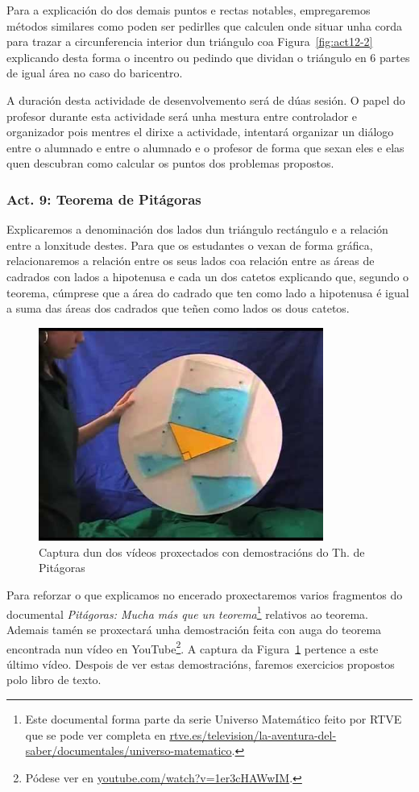Para a explicación do dos demais puntos e rectas notables, empregaremos métodos similares como poden ser pedirlles que calculen onde situar unha corda para trazar a circunferencia interior dun triángulo coa Figura~\ref{fig:act12-2} explicando desta forma o incentro ou pedindo que dividan o triángulo en 6 partes de igual área no caso do baricentro.

A duración desta actividade de desenvolvemento será de dúas sesión. O papel do profesor durante esta actividade será unha mestura entre controlador e organizador pois mentres el dirixe a actividade, intentará organizar un diálogo entre o alumnado e entre o alumnado e o profesor de forma que sexan eles e elas quen descubran como calcular os puntos dos problemas propostos.

\subsubsection{Act. 9: Teorema de Pitágoras}\label{act:pitagoras}
Explicaremos a denominación dos lados dun triángulo rectángulo e a relación entre a lonxitude destes. Para que os estudantes o vexan de forma gráfica, relacionaremos a relación entre os seus lados coa relación entre as áreas de cadrados con lados a hipotenusa e cada un dos catetos explicando que, segundo o teorema, cúmprese que a área do cadrado  que ten como lado a hipotenusa é igual a suma das áreas dos cadrados que teñen como lados os dous catetos.

\begin{figure}[h!]
  \centering
  \includegraphics[height=7cm]{img/pitagoras.jpg}
  \caption{Captura dun dos vídeos proxectados con demostracións do Th. de Pitágoras}\label{fig:act10}
\end{figure}

Para reforzar o que explicamos no encerado proxectaremos varios fragmentos do documental \emph{Pitágoras: Mucha más que un teorema}\footnote{Este documental forma parte da serie Universo Matemático feito por RTVE que se pode ver completa en \href{http://www.rtve.es/television/la-aventura-del-saber/documentales/universo-matematico/}{rtve.es/television/la-aventura-del-saber/documentales/universo-matematico}.} relativos ao teorema. Ademais tamén se proxectará unha demostración feita con auga do teorema encontrada nun vídeo en YouTube\footnote{Pódese ver en \href{https://www.youtube.com/watch?v=1er3cHAWwIM}{youtube.com/watch?v=1er3cHAWwIM}.}. A captura da Figura~\ref{fig:act10} pertence a este último vídeo. Despois de ver estas demostracións, faremos exercicios propostos polo libro de texto.

